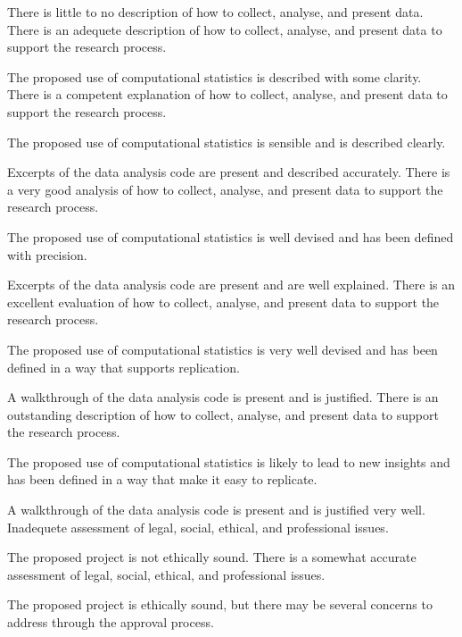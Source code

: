 \begin{markingrubric}
%  
        \grade\fail 	There is little to no description of how to collect, analyse, and present data.
        \grade 		There is an adequete description of how to collect, analyse, and present data to support the research process.
         \par		The proposed use of computational statistics is described with some clarity.        
        \grade 		There is a competent explanation of how to collect, analyse, and present data to support the research process.
         \par		The proposed use of computational statistics is sensible and is described clearly.         
        \par		Excerpts of the data analysis code are present and described accurately.                 
        \grade 		There is a very good analysis of how to collect, analyse, and present data to support the research process.
         \par		The proposed use of computational statistics is well devised and has been defined with precision.                  
        \par		Excerpts of the data analysis code are present and are well explained.   
        \grade 		There is an excellent evaluation of how to collect, analyse, and present data to support the research process.
         \par		The proposed use of computational statistics is very well devised and has been defined in a way that supports replication.      
        \par		A walkthrough of the data analysis code is present and is justified.   
        \grade 		There is an outstanding description of how to collect, analyse, and present data to support the research process.
         \par		The proposed use of computational statistics is likely to lead to new insights and has been defined in a way that make it easy to replicate.        
        \par		A walkthrough of the data analysis code is present and is justified very well. 
%
        \grade\fail 	Inadequete assessment of legal, social, ethical, and professional issues.
         \par		The proposed project is not ethically sound.
        \grade 		There is a somewhat accurate assessment of legal, social, ethical, and professional issues.
        \par		The proposed project is ethically sound, but there may be several concerns to address through the approval process.

\end{markingrubric}
